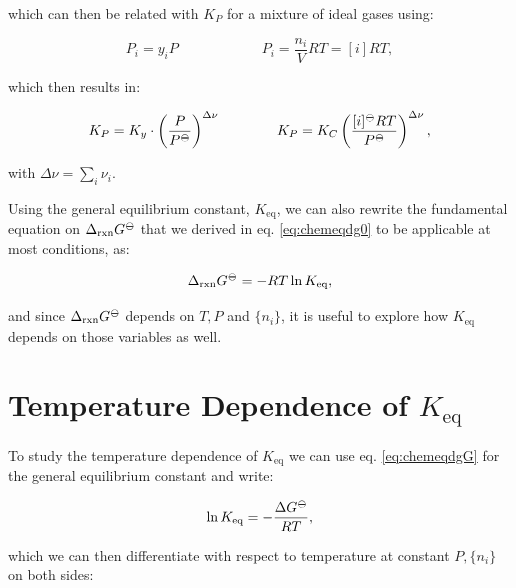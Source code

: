 \documentclass[
  9pt,
]{extbook}
\theoremstyle{definition}
\theoremstyle{definition}
\theoremstyle{definition}
\theoremstyle{remark}
\begin{document}
which can then be related with \(K_P\) for a mixture of ideal gases using:

\begin{equation}
P_i = y_i P \qquad \qquad \qquad P_i=\frac{n_i}{V}RT=[i]RT,
\label{eq:kxkcdef2}
\end{equation}

which then results in:

\begin{equation}
K_P = K_y\cdot \left(\frac{P}{P^{-\kern-6pt{\ominus}\kern-6pt-}}\right)^{\Delta \nu} \qquad \qquad K_P = K_C \left( \frac{[i]^{-\kern-6pt{\ominus}\kern-6pt-}RT}{P^{-\kern-6pt{\ominus}\kern-6pt-}} \right)^{\Delta \nu},
\label{eq:kxkcdef3}
\end{equation}

with \(\Delta \nu =\sum_i \nu_i\).

Using the general equilibrium constant, \(K_{\text{eq}}\), we can also rewrite the fundamental equation on \(\Delta_{\text{rxn}} G^{-\kern-6pt{\ominus}\kern-6pt-}\) that we derived in eq. \eqref{eq:chemeqdg0} to be applicable at most conditions, as:

\begin{equation}
\Delta_{\text{rxn}} G^{-\kern-6pt{\ominus}\kern-6pt-}= - RT \ln K_{\text{eq}},
\label{eq:chemeqdgG}
\end{equation}

and since \(\Delta_{\text{rxn}} G^{-\kern-6pt{\ominus}\kern-6pt-}\) depends on \(T,P\) and \(\{n_i\}\), it is useful to explore how \(K_{\text{eq}}\) depends on those variables as well.

\hypertarget{temperature-dependence-of-k_texteq}{%
\section{\texorpdfstring{Temperature Dependence of \(K_{\text{eq}}\)}{Temperature Dependence of K\_\{\textbackslash text\{eq\}\}}}\label{temperature-dependence-of-k_texteq}}

To study the temperature dependence of \(K_{\text{eq}}\) we can use eq. \eqref{eq:chemeqdgG} for the general equilibrium constant and write:

\begin{equation}
\ln K_{\text{eq}} = -\frac{\Delta G^{-\kern-6pt{\ominus}\kern-6pt-}}{RT},
\label{eq:kptemp1}
\end{equation}

which we can then differentiate with respect to temperature at constant \(P,\{n_i\}\) on both sides:
\end{document}
